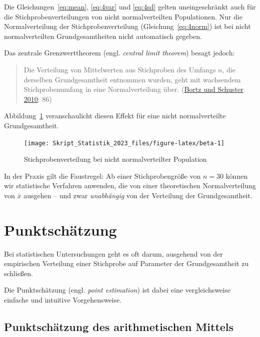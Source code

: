 \documentclass[
  11pt,
  ngerman,
  a4paper,
]{report}
\begin{document}
Die Gleichungen~\eqref{eq:mean}, \eqref{eq:4var} und \eqref{eq:4sd} gelten uneingeschränkt auch für die Stichprobenverteilungen von nicht normalverteilten Populationen. Nur die Normalverteilung der Stichprobenverteilung (Gleichung~\eqref{eq:4norm}) ist bei nicht normalverteilten Grundgesamtheiten nicht automatisch gegeben.

Das zentrale Grenzwerttheorem (engl. \emph{central limit theorem}) besagt jedoch:

\begin{quote}
Die Verteilung von Mittelwerten aus Stichproben des Umfangs \(n\), die derselben Grundgesamtheit entnommen wurden, geht mit wachsendem Stichprobenumfang in eine Normalverteilung über. (\protect\hyperlink{ref-bortz}{Bortz und Schuster 2010}: 86)
\end{quote}

Abbildung~\ref{fig:beta} veranschaulicht diesen Effekt für eine nicht normalverteilte Grundgesamtheit.

\begin{figure}[!h]

{\centering \texttt{[image: Skript\_Statistik\_2023\_files/figure-latex/beta-1]} 

}

\caption{Stichprobenverteilung bei nicht normalverteilter Population}\label{fig:beta}
\end{figure}

In der Praxis gilt die Faustregel: Ab einer Stichprobengröße von \(n=30\) können wir statistische Verfahren anwenden, die von einer theoretischen Normalverteilung von \(\bar{x}\) ausgehen -- und zwar \emph{unabhängig} von der Verteilung der Grundgesamtheit.

\hypertarget{punktschuxe4tzung}{%
\section{Punktschätzung}\label{punktschuxe4tzung}}

Bei statistischen Untersuchungen geht es oft darum, ausgehend von der empirischen Verteilung einer Stichprobe auf Parameter der Grundgesamtheit zu schließen.

Die Punktschätzung (engl. \emph{point estimation}) ist dabei eine vergleichsweise einfache und intuitive Vorgehensweise.

\hypertarget{punktschuxe4tzung-des-arithmetischen-mittels}{%
\subsection{Punktschätzung des arithmetischen Mittels}\label{punktschuxe4tzung-des-arithmetischen-mittels}}
\end{document}
